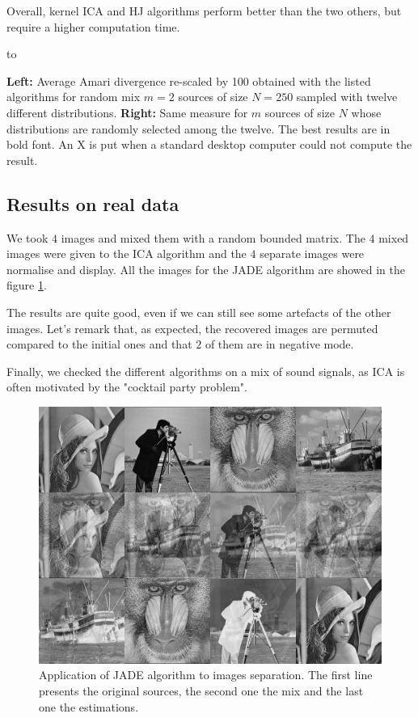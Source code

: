 \documentclass[a4paper]{article}
\begin{document}
Overall, kernel ICA and HJ algorithms perform better than the two others, but
require a higher computation time.

\begin{table}
\centering
\hbox to \textwidth{\hspace{-.5cm}
\resizebox{.45\textwidth}{2cm}{}\hss
\resizebox{.55\textwidth}{2cm}{}
}
\caption{\textbf{Left:} Average Amari divergence re-scaled by 100 obtained with the listed algorithms for random mix $m=2$ sources of size $N=250$ sampled with twelve different distributions. \textbf{Right:} Same measure for $m$ sources of size $N$ whose distributions are randomly selected among the twelve. The best results are in bold font. An X is put when a standard desktop computer could not compute the result.\label{tab:resultats}}
\end{table}

\subsection{Results on real data}

We took $4$ images and mixed them with a random bounded matrix.
The $4$ mixed images were given to the ICA algorithm and the $4$ separate images were normalise and display.
All the images for the JADE algorithm are showed in the figure \ref{fig:res_images}.

The results are quite good, even if we can still see some artefacts of the other images. Let's remark that, as expected, the recovered images are permuted compared to the initial ones and that $2$ of them are in negative mode.

\znl

Finally, we checked the different algorithms on a mix of sound signals, as ICA is often motivated by the "cocktail party problem".



\begin{figure}
\centering
\includegraphics[width=.74\textwidth]{../image_test/unmix4.png}
\caption{Application of JADE algorithm to images separation. The first line presents the original sources, the second one the mix and the last one the estimations.\label{fig:res_images}}
\end{figure}
\end{document}
